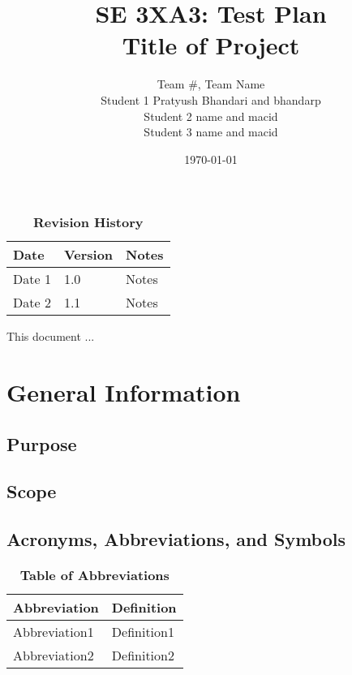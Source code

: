 \documentclass[12pt, titlepage]{article}
\title{SE 3XA3: Test Plan\\Title of Project}
\author{Team \#, Team Name
		\\ Student 1 Pratyush Bhandari and bhandarp
		\\ Student 2 name and macid
		\\ Student 3 name and macid
}
\date{\today}
\begin{document}
\maketitle

\tableofcontents
\listoftables
\listoffigures

\begin{table}[bp]
\caption{\bf Revision History}
\begin{tabularx}{\textwidth}{p{3cm}p{2cm}X}
\toprule {\bf Date} & {\bf Version} & {\bf Notes}\\
\midrule
Date 1 & 1.0 & Notes\\
Date 2 & 1.1 & Notes\\
\bottomrule
\end{tabularx}
\end{table}

\newpage


This document ...

\section{General Information}

\subsection{Purpose}

\subsection{Scope}

\subsection{Acronyms, Abbreviations, and Symbols}
	
\begin{table}[hbp]
\caption{\textbf{Table of Abbreviations}} \label{Table}

\begin{tabularx}{\textwidth}{p{3cm}X}
\toprule
\textbf{Abbreviation} & \textbf{Definition} \\
\midrule
Abbreviation1 & Definition1\\
Abbreviation2 & Definition2\\
\bottomrule
\end{tabularx}

\end{table}
\end{document}
